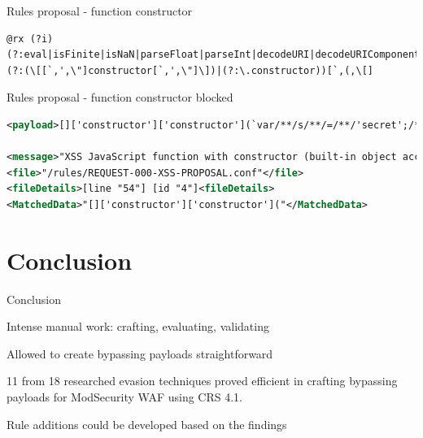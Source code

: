 \documentclass[aspectratio=169]{beamer}
\begin{document}
\begin{frame}[fragile]{Rules proposal - function constructor}
	\begin{lstlisting}[style=basicStyle]
@rx (?i)(?:eval|isFinite|isNaN|parseFloat|parseInt|decodeURI|decodeURIComponent|encodeURI|encodeURIComponent|escape|unescape)(?:(\[[`,',\"]constructor[`,',\"]\])|(?:\.constructor))[`,(,\[]
\end{lstlisting}
\end{frame}

\begin{frame}[fragile]{Rules proposal - function constructor blocked}
	\begin{lstlisting}[style=ruleStyle, language=XML]
<payload>[]['constructor']['constructor'](`var/**/s/**/=/**/'secret';/**/promp`/**/+/**/`t(s,/**/s)`)()</payload>

<message>"XSS JavaScript function with constructor (built-in object access)"</message>
<file>"/rules/REQUEST-000-XSS-PROPOSAL.conf"</file>
<fileDetails>[line "54"] [id "4"]<fileDetails>
<MatchedData>"[]['constructor']['constructor']("</MatchedData>
\end{lstlisting}
\end{frame}

\section{Conclusion}
\begin{frame}[fragile]{Conclusion}
	\begin{vfilleditems}
		\item<2-> Intense manual work: crafting, evaluating, validating
		\item<3-> Allowed to create bypassing payloads straightforward
		\item<4-> 11 from 18 researched evasion techniques proved efficient in crafting bypassing payloads for ModSecurity WAF using CRS 4.1.
		\item<5-> Rule additions could be developed based on the findings
	\end{vfilleditems}
\end{frame}
\end{document}
